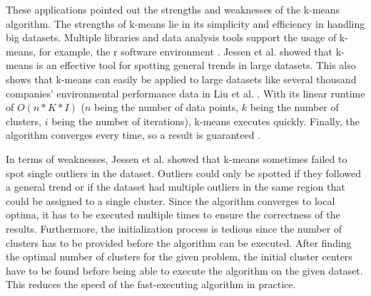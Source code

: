 These applications pointed out the strengths and weaknesses of the k-means algorithm.
The strengths of k-means lie in its simplicity and efficiency in handling big datasets.
Multiple libraries and data analysis tools support the usage of k-means, for example, the r software environment \cite{R-SOF}.
Jessen et al. \cite{JES-IND} showed that k-means is an effective tool for spotting general trends in large datasets.
This also shows that k-means can easily be applied to large datasets like several thousand companies' environmental performance data in Liu et al. \cite{LIU-BDE}.
With its linear runtime of $O(n * K * I)$ ($n$ being the number of data points, $k$ being the number of clusters, $i$ being the number of iterations), k-means executes quickly.
Finally, the algorithm converges every time, so a result is guaranteed \cite{SEL-GCT}.

In terms of weaknesses, Jessen et al. \cite{JES-IND} showed that k-means sometimes failed to spot single outliers in the dataset.
Outliers could only be spotted if they followed a general trend or if the dataset had multiple outliers in the same region that could be assigned to a single cluster.
Since the algorithm converges to local optima, it has to be executed multiple times to ensure the correctness of the results.
Furthermore, the initialization process is tedious since the number of clusters has to be provided before the algorithm can be executed.
After finding the optimal number of clusters for the given problem, the initial cluster centers have to be found before being able to execute the algorithm on the given dataset.
This reduces the speed of the fast-executing algorithm in practice.

